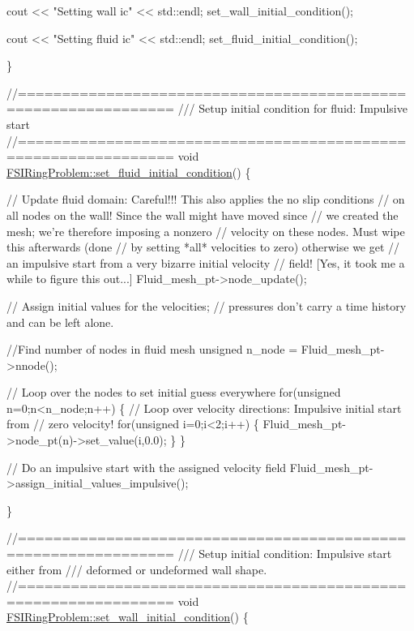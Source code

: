 \begin{DoxyCodeInclude}
 cout << \textcolor{stringliteral}{"Setting wall ic"} << std::endl;
 set\_wall\_initial\_condition();

 cout << \textcolor{stringliteral}{"Setting fluid ic"} << std::endl;
 set\_fluid\_initial\_condition();

\}


\textcolor{comment}{//===============================================================}\textcolor{comment}{}
\textcolor{comment}{/// Setup initial condition for fluid: Impulsive start}
\textcolor{comment}{}\textcolor{comment}{//===============================================================}
\textcolor{keywordtype}{void} \hyperlink{classFSIRingProblem_ad397e4e3b92845240dd6a996856f33e7}{FSIRingProblem::set\_fluid\_initial\_condition}()
\{

 \textcolor{comment}{// Update fluid domain: Careful!!! This also applies the no slip conditions}
 \textcolor{comment}{// on all nodes on the wall! Since the wall might have moved since}
 \textcolor{comment}{// we created the mesh; we're therefore imposing a nonzero}
 \textcolor{comment}{// velocity on these nodes. Must wipe this afterwards (done}
 \textcolor{comment}{// by setting *all* velocities to zero) otherwise we get}
 \textcolor{comment}{// an impulsive start from a very bizarre initial velocity}
 \textcolor{comment}{// field! [Yes, it took me a while to figure this out...]}
 Fluid\_mesh\_pt->node\_update();

 \textcolor{comment}{// Assign initial values for the velocities; }
 \textcolor{comment}{// pressures don't carry a time history and can be left alone.}

 \textcolor{comment}{//Find number of nodes in fluid mesh}
 \textcolor{keywordtype}{unsigned} n\_node = Fluid\_mesh\_pt->nnode();

 \textcolor{comment}{// Loop over the nodes to set initial guess everywhere}
 \textcolor{keywordflow}{for}(\textcolor{keywordtype}{unsigned} n=0;n<n\_node;n++)
  \{
   \textcolor{comment}{// Loop over velocity directions: Impulsive initial start from}
   \textcolor{comment}{// zero velocity!}
   \textcolor{keywordflow}{for}(\textcolor{keywordtype}{unsigned} i=0;i<2;i++)
    \{
     Fluid\_mesh\_pt->node\_pt(n)->set\_value(i,0.0);
    \}
  \}

 \textcolor{comment}{// Do an impulsive start with the assigned velocity field }
 Fluid\_mesh\_pt->assign\_initial\_values\_impulsive();

\}


\textcolor{comment}{//===============================================================}\textcolor{comment}{}
\textcolor{comment}{/// Setup initial condition: Impulsive start either from}
\textcolor{comment}{/// deformed or undeformed wall shape.}
\textcolor{comment}{}\textcolor{comment}{//===============================================================}
\textcolor{keywordtype}{void} \hyperlink{classFSIRingProblem_a5f987c1b22dc306cf7d26be7fa74e322}{FSIRingProblem::set\_wall\_initial\_condition}()
\{ 


\end{DoxyCodeInclude}
